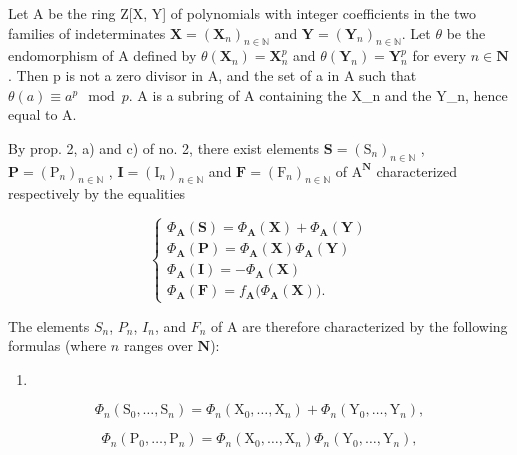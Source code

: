 Let A be the ring Z{[}X, Y{]} of polynomials with integer coefficients in the two families of indeterminates \(\mathbf{X} = (\mathbf{X}_{n})_{n \in \mathbb{N}}\) and \(\mathbf{Y} = (\mathbf{Y}_{n})_{n \in \mathbb{N}}\). Let \(\theta\) be the endomorphism of A defined by \(\theta(\mathbf{X}_{n}) = \mathbf{X}_{n}^{p}\) and \(\theta(\mathbf{Y}_{n}) = \mathbf{Y}_{n}^{p}\) for every \(n \in \mathbf{N}\). Then p is not a zero divisor in A, and the set of a in A such that \(\theta(a) \equiv a^{p} \mod p\). A is a subring of A containing the X\_n and the Y\_n, hence equal to A.

By prop. 2, a) and c) of no. 2, there exist elements \(\mathbf{S} = (\mathrm{S}_{n})_{n\in\mathbb{N}}\) , \(\mathbf{P} = (\mathrm{P}_{n})_{n\in\mathbb{N}}\) , \(\mathbf{I} = (\mathrm{I}_{n})_{n\in\mathbb{N}}\) and \(\mathbf{F} = (\mathrm{F}_{n})_{n\in\mathbb{N}}\) of \(\mathrm{A}^{\mathbf{N}}\) characterized respectively by the equalities

\[
\left\{ \begin{array}{l} \Phi_ {\mathbf {A}} (\mathbf {S}) = \Phi_ {\mathbf {A}} (\mathbf {X}) + \Phi_ {\mathbf {A}} (\mathbf {Y}) \\ \Phi_ {\mathbf {A}} (\mathbf {P}) = \Phi_ {\mathbf {A}} (\mathbf {X}) \Phi_ {\mathbf {A}} (\mathbf {Y}) \\ \Phi_ {\mathbf {A}} (\mathbf {I}) = - \Phi_ {\mathbf {A}} (\mathbf {X}) \\ \Phi_ {\mathbf {A}} (\mathbf {F}) = f _ {\mathbf {A}} \big (\Phi_ {\mathbf {A}} (\mathbf {X}) \big). \end{array} \right.\tag{11}
\]

The elements \(S_{n}\), \(P_{n}\), \(I_{n}\), and \(F_{n}\) of A are therefore characterized by the following formulas (where \(n\) ranges over \(\mathbf{N}\)):

\begin{enumerate}
\def\labelenumi{(\arabic{enumi})}
\setcounter{enumi}{11}
\tightlist
\item
\end{enumerate}

\[
\Phi_ {n} \left(\mathrm{S} _ {0}, \dots , \mathrm{S} _ {n}\right) = \Phi_ {n} \left(\mathrm{X} _ {0}, \dots , \mathrm{X} _ {n}\right) + \Phi_ {n} \left(\mathrm{Y} _ {0}, \dots , \mathrm{Y} _ {n}\right),\tag{13}
\]

\[
\Phi_ {n} \left(\mathrm{P} _ {0}, \dots , \mathrm{P} _ {n}\right) = \Phi_ {n} \left(\mathrm{X} _ {0}, \dots , \mathrm{X} _ {n}\right) \Phi_ {n} \left(\mathrm{Y} _ {0}, \dots , \mathrm{Y} _ {n}\right),\tag{14}
\]


